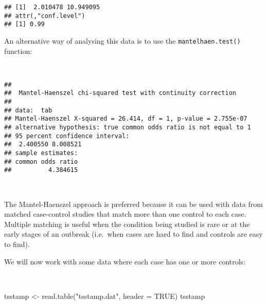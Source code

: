 \documentclass[
  12pt,
  a4paper]{book}
\newenvironment{Shaded}{\begin{snugshade}}{\end{snugshade}}
\newcommand{\AttributeTok}[1]{\textcolor[rgb]{0.77,0.63,0.00}{#1}}
\newcommand{\ConstantTok}[1]{\textcolor[rgb]{0.00,0.00,0.00}{#1}}
\newcommand{\FunctionTok}[1]{\textcolor[rgb]{0.00,0.00,0.00}{#1}}
\newcommand{\NormalTok}[1]{#1}
\newcommand{\OtherTok}[1]{\textcolor[rgb]{0.56,0.35,0.01}{#1}}
\newcommand{\SpecialCharTok}[1]{\textcolor[rgb]{0.00,0.00,0.00}{#1}}
\newcommand{\StringTok}[1]{\textcolor[rgb]{0.31,0.60,0.02}{#1}}
\begin{document}
\begin{verbatim}
## [1]  2.010478 10.949095
## attr(,"conf.level")
## [1] 0.99
\end{verbatim}

\newpage

An alternative way of analysing this data is to use the \texttt{mantelhaen.test()} function:

~

\begin{Shaded}
\end{Shaded}

\begin{verbatim}
## 
##  Mantel-Haenszel chi-squared test with continuity correction
## 
## data:  tab
## Mantel-Haenszel X-squared = 26.414, df = 1, p-value = 2.755e-07
## alternative hypothesis: true common odds ratio is not equal to 1
## 95 percent confidence interval:
##  2.400550 8.008521
## sample estimates:
## common odds ratio 
##          4.384615
\end{verbatim}

~

The Mantel-Haenszel approach is preferred because it can be used with data from matched case-control studies that match more than one control to each case. Multiple matching is useful when the condition being studied is rare or at the early stages of an outbreak (i.e.~when cases are hard to find and controls are easy to find).

We will now work with some data where each case has one or more controls:

~

\begin{Shaded}
\begin{Highlighting}[]
\NormalTok{tsstamp }\OtherTok{\textless{}{-}} \FunctionTok{read.table}\NormalTok{(}\StringTok{"tsstamp.dat"}\NormalTok{, }\AttributeTok{header =} \ConstantTok{TRUE}\NormalTok{)}
\NormalTok{tsstamp}
\end{Highlighting}
\end{Shaded}
\end{document}
